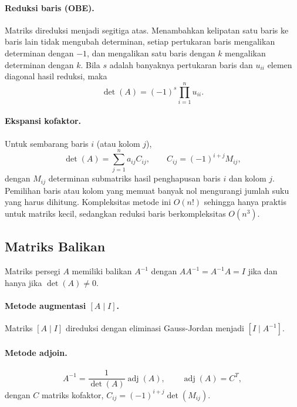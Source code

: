 \documentclass[12pt,a4paper]{article}
\DeclareMathOperator{\adj}{adj}
\begin{document}
\paragraph{Reduksi baris (OBE).} Matriks direduksi menjadi segitiga atas. Menambahkan kelipatan satu baris ke baris lain tidak mengubah determinan, setiap pertukaran baris mengalikan determinan dengan $-1$, dan mengalikan satu baris dengan $k$ mengalikan determinan dengan $k$. Bila $s$ adalah banyaknya pertukaran baris dan $u_{ii}$ elemen diagonal hasil reduksi, maka
\begin{equation}
  \det(A)=(-1)^{s}\prod_{i=1}^{n}u_{ii}.
\end{equation}

\paragraph{Ekspansi kofaktor.} Untuk sembarang baris $i$ (atau kolom $j$),
\begin{equation}
  \det(A)=\sum_{j=1}^{n}a_{ij}C_{ij},\qquad C_{ij}=(-1)^{i+j}M_{ij},
\end{equation}
dengan $M_{ij}$ determinan submatriks hasil penghapusan baris $i$ dan kolom $j$. Pemilihan baris atau kolom yang memuat banyak nol mengurangi jumlah suku yang harus dihitung. Kompleksitas metode ini $O(n!)$ sehingga hanya praktis untuk matriks kecil, sedangkan reduksi baris berkompleksitas $O(n^3)$.

\subsection{Matriks Balikan}
Matriks persegi $A$ memiliki balikan $A^{-1}$ dengan $AA^{-1}=A^{-1}A=I$ jika dan hanya jika $\det(A)\neq0$.

\paragraph{Metode augmentasi $[A\mid I]$.} Matriks $[A\mid I]$ direduksi dengan eliminasi Gauss-Jordan menjadi $[I\mid A^{-1}]$.

\paragraph{Metode adjoin.}
\begin{equation}
  A^{-1}=\frac{1}{\det(A)}\adj(A),\qquad \adj(A)=C^{T},
\end{equation}
dengan $C$ matriks kofaktor, $C_{ij}=(-1)^{i+j}\det(M_{ij})$.
\end{document}
